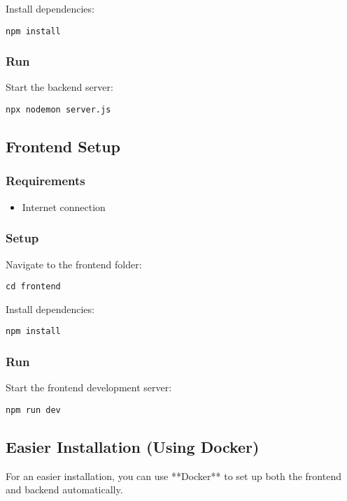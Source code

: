 Install dependencies:
\begin{verbatim}
npm install
\end{verbatim}

\subsubsection{Run}
Start the backend server:
\begin{verbatim}
npx nodemon server.js
\end{verbatim}

\subsection{Frontend Setup}

\subsubsection{Requirements}
\begin{itemize}
    \item Internet connection
\end{itemize}

\subsubsection{Setup}
Navigate to the frontend folder:
\begin{verbatim}
cd frontend
\end{verbatim}

Install dependencies:
\begin{verbatim}
npm install
\end{verbatim}

\subsubsection{Run}
Start the frontend development server:
\begin{verbatim}
npm run dev
\end{verbatim}

\subsection{Easier Installation (Using Docker)}
For an easier installation, you can use **Docker** to set up both the frontend and backend automatically.

